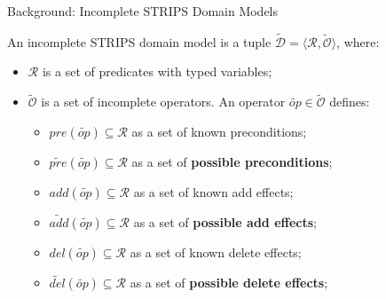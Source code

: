 \documentclass[usenames,dvipsnames]{beamer}
\newcommand{\incp}[1]{\widetilde{\mathcal{#1}}}
\newcommand{\inc}[1]{\widetilde{#1}}
\begin{document}
    \begin{frame}{Background: Incomplete STRIPS Domain Models}
		\begin{definition} 
			An incomplete STRIPS domain model is a tuple $\incp{D} = \langle \mathcal{R}, \incp{O} \rangle$, where:
			\begin{itemize}
				\item $\mathcal{R}$ is a set of predicates with typed variables;
				\item $\incp{O}$ is a set of incomplete operators. An operator $\inc{op} \in \incp{O}$ defines: 
				\begin{itemize}
					\item $pre(\inc{op}) \subseteq \mathcal{R}$ as a set of known preconditions;
					\item $\widetilde{pre}(\inc{op}) \subseteq \mathcal{R}$ as a set of \textbf{possible preconditions};
					\item $add(\inc{op}) \subseteq \mathcal{R}$ as a set of known add effects;
					\item $\widetilde{add}(\inc{op}) \subseteq \mathcal{R}$ as a set of \textbf{possible add effects};
					\item $del(\inc{op}) \subseteq \mathcal{R}$ as a set of known delete effects;
					\item $\widetilde{del}(\inc{op}) \subseteq \mathcal{R}$ as a set of \textbf{possible delete effects};
				\end{itemize}
			\end{itemize}
		\end{definition}
    \end{frame}
\end{document}
